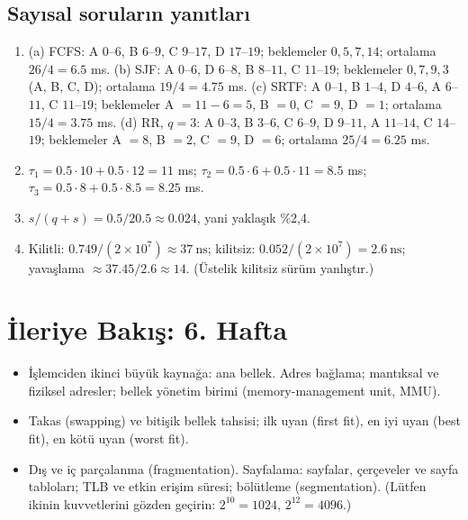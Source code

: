 \documentclass[11pt,a4paper]{article}
\begin{document}
\subsection*{Sayısal soruların yanıtları}
\begin{enumerate}[leftmargin=1.6em,start=9]
  \item (a) FCFS: A $0$--$6$, B $6$--$9$, C $9$--$17$, D $17$--$19$; beklemeler $0,5,7,14$; ortalama $26/4 = 6.5$ ms.
  (b) SJF: A $0$--$6$, D $6$--$8$, B $8$--$11$, C $11$--$19$; beklemeler $0,7,9,3$ (A, B, C, D); ortalama $19/4 = 4.75$ ms.
  (c) SRTF: A $0$--$1$, B $1$--$4$, D $4$--$6$, A $6$--$11$, C $11$--$19$; beklemeler A $=11-6=5$, B $=0$, C $=9$, D $=1$; ortalama $15/4 = 3.75$ ms.
  (d) RR, $q=3$: A $0$--$3$, B $3$--$6$, C $6$--$9$, D $9$--$11$, A $11$--$14$, C $14$--$19$; beklemeler A $=8$, B $=2$, C $=9$, D $=6$; ortalama $25/4 = 6.25$ ms.
  \item $\tau_1 = 0.5\cdot10 + 0.5\cdot12 = 11$ ms; $\tau_2 = 0.5\cdot6 + 0.5\cdot11 = 8.5$ ms; $\tau_3 = 0.5\cdot8 + 0.5\cdot8.5 = 8.25$ ms.
  \item $s/(q+s) = 0.5/20.5 \approx 0.024$, yani yaklaşık \%2,4.
  \item Kilitli: $0.749/(2\times10^{7}) \approx 37\ \text{ns}$; kilitsiz: $0.052/(2\times10^{7}) = 2.6\ \text{ns}$; yavaşlama $\approx 37.45/2.6 \approx 14$. (Üstelik kilitsiz sürüm yanlıştır.)
\end{enumerate}

\section{İleriye Bakış: 6. Hafta}

\begin{itemize}
  \item İşlemciden ikinci büyük kaynağa: ana bellek. Adres bağlama; mantıksal ve fiziksel adresler; bellek yönetim birimi (memory-management unit, MMU).
  \item Takas (swapping) ve bitişik bellek tahsisi; ilk uyan (first fit), en iyi uyan (best fit), en kötü uyan (worst fit).
  \item Dış ve iç parçalanma (fragmentation). Sayfalama: sayfalar, çerçeveler ve sayfa tabloları; TLB ve etkin erişim süresi; bölütleme (segmentation). (Lütfen ikinin kuvvetlerini gözden geçirin: $2^{10} = 1024$, $2^{12} = 4096$.)
\end{itemize}
\end{document}
